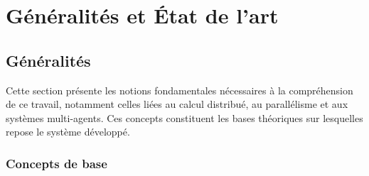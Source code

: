 \documentclass[12pt,a4paper]{report}
\begin{document}
\listoftables

\chapter{Généralités et État de l'art}

\section{Généralités}

Cette section présente les notions fondamentales nécessaires à la compréhension de ce travail, notamment celles liées au calcul distribué, au parallélisme et aux systèmes multi-agents. Ces concepts constituent les bases théoriques sur lesquelles repose le système développé.

\subsection{Concepts de base}
\end{document}
